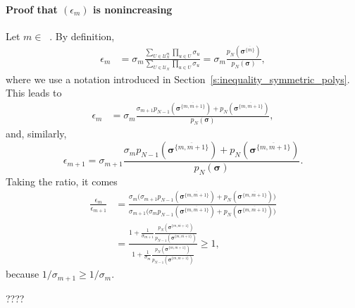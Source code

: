 \documentclass[twoside,11pt]{book}
\numberwithin{theorem}{chapter}
\numberwithin{definition}{chapter}
\numberwithin{proposition}{chapter}
\numberwithin{corollary}{chapter}
\numberwithin{example}{chapter}
\numberwithin{lemma}{chapter}
\DeclareMathOperator{\Ns}{\mathbb{N}^{*}}
\begin{document}
\paragraph{Proof that $(\epsilon_{m})$ is nonincreasing}
\label{s:epsilon_non_increasing}
Let $m \in \Ns$. By definition,
\begin{align}
\epsilon_{m} & = \sigma_{m} \frac{\sum_{U \in \mathcal{U}_{N}^{m}} \prod_{u \in U} \sigma_{u}}{\sum_{U \in \mathcal{U}_{N}} \prod_{u \in U} \sigma_{u}} = \sigma_{m} \frac{p_{N}(\bm{\sigma}^{\overline{\{m\}}})}{p_{N}(\bm{\sigma})},
\end{align}
where we use a notation introduced in Section~\ref{s:inequality_symmetric_polys}. This leads to
\begin{align}
  \epsilon_m & = \sigma_{m} \frac{ \sigma_{m+1}p_{N-1}(\bm{\sigma}^{\overline{\{m,m+1 \}}}) + p_{N}(\bm{\sigma}^{\overline{\{m,m+1 \}}})}{p_{N}(\bm{\sigma})},
\end{align}
and, similarly,
\begin{equation}
\epsilon_{m+1} = \sigma_{m+1} \frac{ \sigma_{m}p_{N-1}(\bm{\sigma}^{\overline{\{m,m+1 \}}}) + p_{N}(\bm{\sigma}^{\overline{\{m,m+1 \}}})}{p_{N}(\bm{\sigma})}.
\end{equation}
Taking the ratio, it comes
\begin{align}
\frac{\epsilon_{m}}{\epsilon_{m+1}} & = \frac{\sigma_{m} \bigg( \sigma_{m+1}p_{N-1}\left(\bm{\sigma}^{\overline{\{m,m+1 \}}} \right) + p_{N} \left(\bm{\sigma}^{\overline{\{m,m+1 \}}} \right)\bigg)}{\sigma_{m+1} \bigg( \sigma_{m}p_{N-1}\left(\bm{\sigma}^{\overline{\{m,m+1 \}}} \right) + p_{N} \left(\bm{\sigma}^{\overline{\{m,m+1 \}}}\right)\bigg)}\\
& = \frac{1  + \frac{1}{\sigma_{m+1}}\frac{p_{N} \left(\bm{\sigma}^{\overline{\{m,m+1 \}}} \right) }{ p_{N-1} \left(\bm{\sigma}^{\overline{\{m,m+1 \}}} \right)} }{1  + \frac{1}{\sigma_{m} }\frac{p_{N} \left(\bm{\sigma}^{\overline{\{m,m+1 \}}} \right) }{p_{N-1} \left(\bm{\sigma}^{\overline{\{m,m+1 \}}}\right)}} \geq 1,
\end{align}
because $1/\sigma_{m+1} \geq 1/\sigma_{m}$.

????
\end{document}
